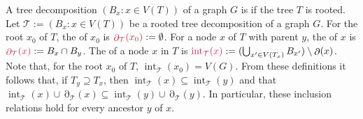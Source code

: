 \documentclass{patmorin}
\DeclareMathOperator{\interior}{int}
\DeclareMathOperator{\boundary}{\partial}
\begin{document}
A tree decomposition $(B_x:x\in V(T))$ of a graph $G$ is  if the tree $T$ is rooted.  Let $\mathcal{T}:=(B_x:x\in V(T))$ be a rooted tree decomposition of a graph $G$.    For the root $x_0$ of $T$, the  of $x_0$ is $\mathdefin{\boundary_{\mathcal{T}}(x_0)}:=\emptyset$.  For a node $x$ of $T$ with parent $y$, the  of $x$ is $\mathdefin{\boundary_\mathcal{T}(x)}:=B_x\cap B_y$.  The  of a node $x$ in $T$ is $\mathdefin{\interior_\mathcal{T}(x)}:=(\bigcup_{x'\in V(T_x)} B_{x'})\setminus \boundary(x)$.  Note that, for the root $x_0$ of $T$, $\interior_{\mathcal{T}}(x_0)=V(G)$.  From these definitions it follows that, if $T_y\supseteq T_x$, then $\interior_{\mathcal{T}}(x)\subseteq\interior_{\mathcal{T}}(y)$ and that $\interior_\mathcal{T}(x) \cup \boundary_\mathcal{T}(x)\subseteq \interior_\mathcal{T}(y) \cup \boundary_\mathcal{T}(y)$. In particular, these inclusion relations hold for every ancestor $y$ of $x$.





\end{document}
